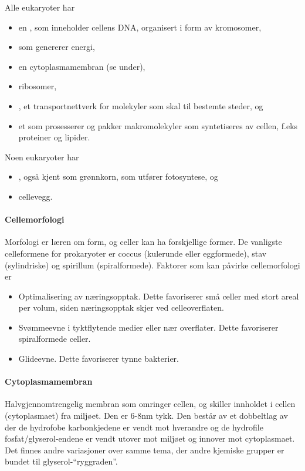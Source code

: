 \noindent Alle eukaryoter har
\begin{itemize}[nolistsep,noitemsep]
	\item en , som inneholder cellens DNA, organisert i form av kromosomer,
	\item {} som genererer energi,
	\item en cytoplasmamembran (se under),
	\item ribosomer,
	\item {}, et transportnettverk for molekyler som skal til bestemte steder, og
	\item et  som prosesserer og pakker makromolekyler som syntetiseres av cellen, f.eks proteiner og lipider.
\end{itemize}
\noindent Noen eukaryoter har
\begin{itemize}[nolistsep,noitemsep]
	\item {}, også kjent som grønnkorn, som utfører fotosyntese, og
	\item cellevegg.
\end{itemize}

\paragraph{Cellemorfologi} Morfologi er læren om form, og celler kan ha forskjellige former. De vanligste celleformene for prokaryoter er coccus (kulerunde eller eggformede), stav (sylindriske) og spirillum (spiralformede). Faktorer som kan påvirke cellemorfologi er
\begin{itemize}[nolistsep,noitemsep]
	\item Optimalisering av næringsopptak. Dette favoriserer små celler med stort areal per volum, siden næringsopptak skjer ved celleoverflaten.
	\item Svømmeevne i tyktflytende medier eller nær overflater. Dette favoriserer spiralformede celler.
	\item Glideevne. Dette favoriserer tynne bakterier.
\end{itemize}

\paragraph{Cytoplasmamembran} Halvgjennomtrengelig membran som omringer cellen, og skiller innholdet i cellen (cytoplasmaet) fra miljøet. Den er 6-8nm tykk. Den består av et dobbeltlag av  der de hydrofobe karbonkjedene er vendt mot hverandre og de hydrofile fosfat/glyserol-endene er vendt utover mot miljøet og innover mot cytoplasmaet. Det finnes andre variasjoner over samme tema, der andre kjemiske grupper er bundet til glyserol-``ryggraden''. 

